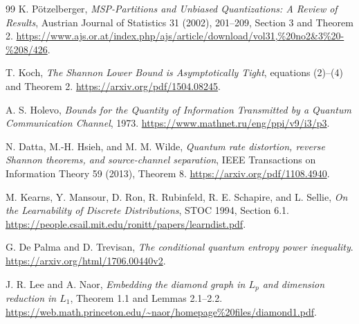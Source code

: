 \documentclass[11pt]{article}
\theoremstyle{definition}
\begin{document}
\begin{thebibliography}{99}
K. P\"otzelberger, \emph{MSP-Partitions and Unbiased Quantizations:
A Review of Results}, Austrian Journal of Statistics 31 (2002), 201--209,
Section 3 and Theorem 2.
\url{https://www.ajs.or.at/index.php/ajs/article/download/vol31,%20no2&3%20-%208/426}.

T. Koch, \emph{The Shannon Lower Bound is Asymptotically Tight},
equations (2)--(4) and Theorem 2.
\url{https://arxiv.org/pdf/1504.08245}.

A. S. Holevo, \emph{Bounds for the Quantity of Information Transmitted
by a Quantum Communication Channel}, 1973.
\url{https://www.mathnet.ru/eng/ppi/v9/i3/p3}.

N. Datta, M.-H. Hsieh, and M. M. Wilde,
\emph{Quantum rate distortion, reverse Shannon theorems, and
source-channel separation}, IEEE Transactions on Information Theory 59
(2013), Theorem 8.
\url{https://arxiv.org/pdf/1108.4940}.

M. Kearns, Y. Mansour, D. Ron, R. Rubinfeld, R. E. Schapire,
and L. Sellie, \emph{On the Learnability of Discrete Distributions},
STOC 1994, Section 6.1.
\url{https://people.csail.mit.edu/ronitt/papers/learndist.pdf}.

G. De Palma and D. Trevisan,
\emph{The conditional quantum entropy power inequality}.
\url{https://arxiv.org/html/1706.00440v2}.

J. R. Lee and A. Naor,
\emph{Embedding the diamond graph in $L_p$ and dimension reduction in $L_1$},
Theorem 1.1 and Lemmas 2.1--2.2.
\url{https://web.math.princeton.edu/~naor/homepage%20files/diamond1.pdf}.
\end{thebibliography}
\end{document}
